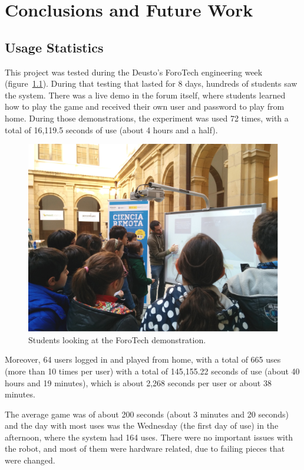\chapter{Conclusions and Future Work}

\section{Usage Statistics}

This project was tested during the Deusto's ForoTech engineering week (figure~\ref{fig:forotech}).
During that testing that lasted for 8 days, hundreds of students saw the system. There was a live
demo in the forum itself, where students learned how to play the game and received their own user
and password to play from home. During those demonstrations, the experiment was used 72 times, with
a total of 16,119.5 seconds of use (about 4 hours and a half).

\begin{figure}[ht]
	\centering
	\includegraphics[height=0.3\textheight]{fig/forotech}
	\caption{Students looking at the ForoTech demonstration.}
	\label{fig:forotech}
\end{figure}

Moreover, 64 users logged in and played from home, with a total of 665 uses (more than 10 times per
user) with a total of 145,155.22 seconds of use (about 40 hours and 19 minutes), which is about
2,268 seconds per user or about 38 minutes.

The average game was of about 200 seconds (about 3 minutes and 20 seconds) and the day with most
uses was the Wednesday (the first day of use) in the afternoon, where the system had 164 uses. There
were no important issues with the robot, and most of them were hardware related, due to failing
pieces that were changed.


